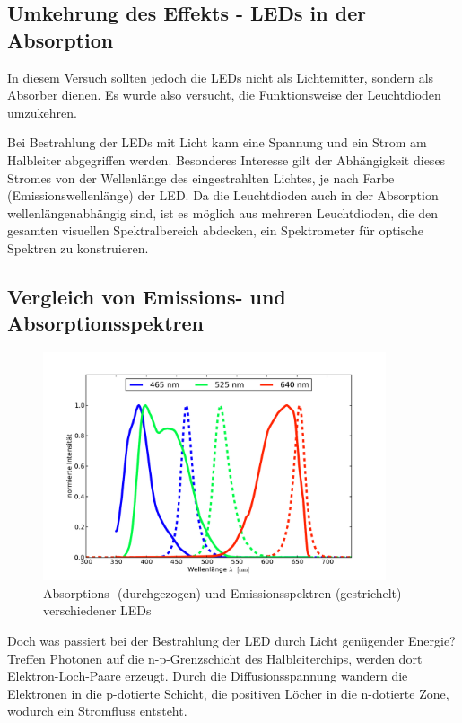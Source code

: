 \documentclass[11pt]{scrartcl}
\begin{document}
\subsection{Umkehrung des Effekts - LEDs in der Absorption}
In diesem Versuch sollten jedoch die LEDs nicht als Lichtemitter, sondern als Absorber dienen. Es wurde also versucht, die Funktionsweise der Leuchtdioden umzukehren.

Bei Bestrahlung der LEDs mit Licht kann eine Spannung und ein Strom am Halbleiter abgegriffen werden. Besonderes Interesse gilt der Abhängigkeit dieses Stromes von der Wellenlänge des eingestrahlten Lichtes, je nach Farbe (Emissionswellenlänge) der LED. Da die Leuchtdioden auch in der Absorption wellenlängenabhängig sind, ist es möglich aus mehreren Leuchtdioden, die den gesamten visuellen Spektralbereich abdecken, ein Spektrometer für optische Spektren zu konstruieren.

\subsection{Vergleich von Emissions- und Absorptionsspektren}
\begin{figure}[!b]
\begin{center}
\includegraphics[width=0.9\textwidth]{absorp-emit.pdf}
\end{center}
\vspace{-1.5\baselineskip}
\caption{Absorptions- (durchgezogen) und Emissionsspektren (gestrichelt) verschiedener LEDs}
\label{Absorption und Emission von LEDs}
\end{figure}

Doch was passiert bei der Bestrahlung der LED durch Licht genügender Energie? Treffen Photonen auf die n-p-Grenzschicht des Halbleiterchips, werden dort Elektron-Loch-Paare erzeugt. Durch die Diffusionsspannung wandern die Elektronen in die p-dotierte Schicht, die positiven Löcher in die n-dotierte Zone, wodurch ein Stromfluss entsteht.
\end{document}
